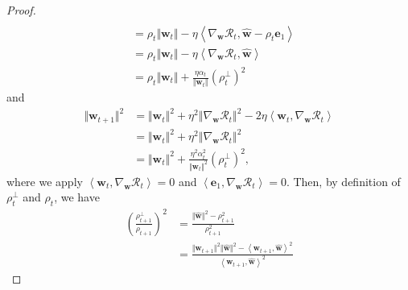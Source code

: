 \documentclass[pdflatex,sn-basic]{sn-jnl}%
\theoremstyle{thmstyleone}%
\begin{document}
\begin{appendices}
\begin{proof}
\begin{equation*}
\begin{aligned}
    \\ & = 
    \rho_t \Vert \mathbf{w}_t \Vert
    -
    \eta \left\langle \nabla_{\mathbf{w}} \mathcal{R}_t, \hat{\mathbf{w}} - \rho_t \mathbf{e}_1 \right\rangle
    \\ & = 
    \rho_t \Vert \mathbf{w}_t \Vert
    -
    \eta \left\langle \nabla_{\mathbf{w}} \mathcal{R}_t, \hat{\mathbf{w}} \right\rangle
    \\ & = 
    \rho_t \Vert \mathbf{w}_t \Vert
    +
    \frac{\eta \alpha_t}{\Vert \mathbf{w}_{t} \Vert} \left( \rho_t^{\perp} \right)^2
  \end{aligned}
  \end{equation*}
  and 
  \begin{equation*}
  \begin{aligned}
    \Vert \mathbf{w}_{t+1} \Vert^2 
    & = 
    \Vert \mathbf{w}_{t} \Vert^2
    + 
    \eta^2 \left\Vert \nabla_{\mathbf{w}} \mathcal{R}_t \right\Vert^2 
    - 
    2 \eta \left\langle \mathbf{w}_{t}, \nabla_{\mathbf{w}} \mathcal{R}_t\right\rangle 
    \\ & = 
    \Vert \mathbf{w}_{t} \Vert^2
    + 
    \eta^2 \left\Vert \nabla_{\mathbf{w}} \mathcal{R}_t \right\Vert^2 
    \\ & = 
    \Vert \mathbf{w}_{t} \Vert^2
    + 
    \frac{\eta^2 \alpha_t^2}{\Vert \mathbf{w}_{t} \Vert^2} \left(\rho_t^{\perp}\right)^2,
  \end{aligned}
  \end{equation*}
  where we apply $\left\langle \mathbf{w}_{t}, \nabla_{\mathbf{w}} \mathcal{R}_t\right\rangle = 0$ and 
  $\left\langle \mathbf{e}_{1}, \nabla_{\mathbf{w}} \mathcal{R}_t\right\rangle = 0$. 
  Then, by definition of $\rho_t^\perp$ and $\rho_t$, we have 
  \begin{equation*}
  \begin{aligned}
    \left(\frac{\rho_{t+1}^{\perp}}{\rho_{t+1}}\right)^2
    & = 
    \frac{\Vert \hat{\mathbf{w}} \Vert^2 - \rho_{t+1}^2}{\rho_{t+1}^2}
    \\ & = 
    \frac{\Vert \mathbf{w}_{t+1} \Vert^2 \Vert \hat{\mathbf{w}} \Vert^2 - \left\langle \mathbf{w}_{t+1}, \hat{\mathbf{w}} \right\rangle^2}
    {\left\langle \mathbf{w}_{t+1}, \hat{\mathbf{w}} \right\rangle^2}

\end{aligned}
\end{equation*}
\end{proof}
\end{appendices}
\end{document}
